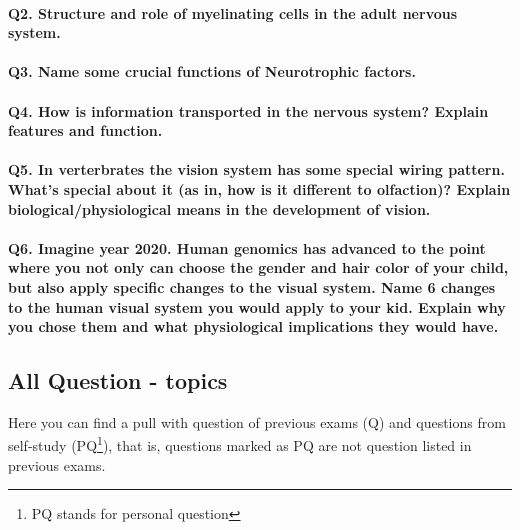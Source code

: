 \documentclass[12pt,article,oneside,a4paper]{memoir}
\begin{document}
\paragraph{Q2. Structure and role of myelinating cells in the adult nervous system.}
\paragraph{Q3. Name some crucial functions of Neurotrophic factors.}
\paragraph{Q4. How is information transported in the nervous system? Explain features and function.}
\paragraph{Q5. In verterbrates the vision system has some special wiring pattern. What's special about it (as in, how is it different to olfaction)? Explain biological/physiological means in the development of vision.}
\paragraph{Q6. Imagine year 2020. Human genomics has advanced to the point where you not only can choose the gender and hair color of your child, but also apply specific changes to the visual system. Name 6 changes to the human visual system you would apply to your kid. Explain why you chose them and what physiological implications they would have.}

\newpage
\subsection{All Question - topics}

Here you can find a pull with question of previous exams (Q) and questions from self-study (PQ\footnote{PQ stands for personal question}), that is, questions marked as PQ are not question listed in previous exams.

\end{document}
